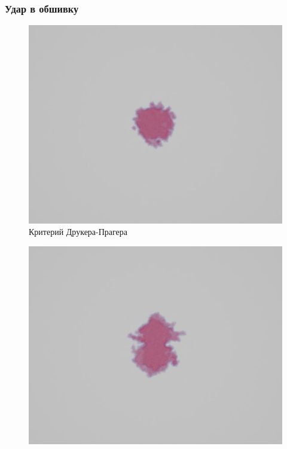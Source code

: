 \documentclass[xcolor={usenames,dvipsnames,svgnames,table}]{beamer}
\begin{document}
\begin{frame}
    \frametitle{Удар в обшивку}
    \begin{center}
        \begin{minipage}[h]{0.30\textwidth}
            \begin{figure}[h]
                \includegraphics[width=\textwidth]{png/3-stringer-panel/cover-drucker-prager.png}
                \tiny
                \caption{Критерий Друкера-Прагера}
            \end{figure}
        \end{minipage}
        \begin{minipage}[h]{0.30\textwidth}
            \begin{figure}[h]
                \includegraphics[width=\textwidth]{png/3-stringer-panel/cover-hashin.png}

\end{figure}
\end{minipage}
\end{center}
\end{frame}
\end{document}
